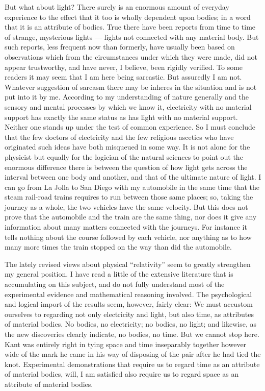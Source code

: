 \documentclass[a4paper, 11pt, oneside, polutonikogreek, english, landscape]{article}
\begin{document}
But what about light? There surely is an enormous amount of everyday experience to the effect that it too is wholly dependent upon bodies; in a word that it is an attribute of bodies. True there have been reports from time to time of strange, mysterious lights --- lights not connected with any material body. But such reports, less frequent now than formerly, have usually been based on observations which from the circumstances under which they were made, did not appear trustworthy, and have never, I believe, been rigidly verified. To some readers it may seem that I am here being sarcastic. But assuredly I am not. Whatever suggestion of sarcasm there may be inheres in the situation and is not put into it by me. According to my understanding of nature generally and the sensory and mental processes by which we know it, electricity with no material support has exactly the same status as has light with no material support. Neither one stands up under the test of common experience. So I must conclude that the few doctors of electricity and the few religious ascetics who have originated such ideas have both misqueued in some way. It is not alone for the physicist but equally for the logician of the natural sciences to point out the enormous difference there is between the question of how light gets across the interval between one body and another, and that of the ultimate nature of light. I can go from La Jolla to San Diego with my automobile in the same time that the steam rail-road trains requires to run between those same places; so, taking the journey as a whole, the two vehicles have the same velocity. But this does not prove that the automobile and the train are the same thing, nor does it give any information about many matters connected with the journeys. For instance it tells nothing about the course followed by each vehicle, nor anything as to how many more times the train stopped on the way than did the automobile.

The lately revised views about physical ``relativity'' seem to greatly strengthen my general position. I have read a little of the extensive literature that is accumulating on this subject, and do not fully understand most of the experimental evidence and mathematical reasoning involved. The psychological and logical import of the results seem, however, fairly clear: We must accustom ourselves to regarding not only electricity and light, but also time, as attributes of material bodies. No bodies, no electricity; no bodies, no light; and likewise, as the new discoveries clearly indicate, no bodies, no time. But we cannot stop here. Kant was entirely right in tying space and time inseparably together however wide of the mark he came in his way of disposing of the pair after he had tied the knot. Experimental demonstrations that require us to regard time as an attribute of material bodies, will, I am satisfied also require us to regard space as an attribute of material bodies.
\end{document}
